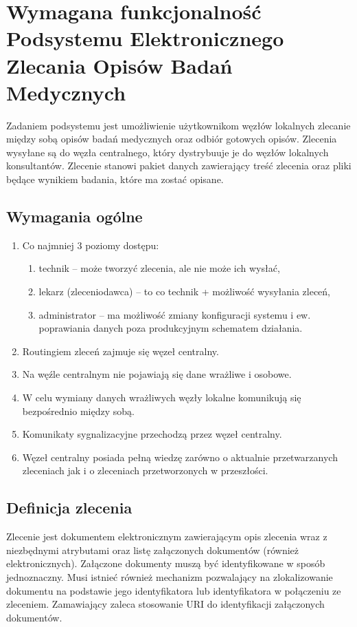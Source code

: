 \documentclass[a4paper]{article}
\begin{document}
\section{Wymagana funkcjonalność Podsystemu Elektronicznego Zlecania Opisów Badań Medycznych}

Zadaniem podsystemu jest umożliwienie użytkownikom węzłów lokalnych zlecanie między sobą opisów badań medycznych oraz odbiór gotowych opisów. Zlecenia wysyłane są do węzła centralnego, który dystrybuuje je do węzłów lokalnych konsultantów. Zlecenie stanowi pakiet danych zawierający treść zlecenia oraz pliki będące wynikiem badania, które ma zostać opisane. 

\subsection{Wymagania ogólne}
\begin{enumerate}
\item Co najmniej 3 poziomy dostępu:
        \begin{enumerate}
        \item technik -- może tworzyć zlecenia, ale nie może ich wysłać,
        \item lekarz (zleceniodawca) -- to co technik + możliwość wysyłania zleceń,
        \item administrator -- ma możliwość zmiany konfiguracji systemu i ew. poprawiania danych poza produkcyjnym schematem działania.
        \end{enumerate}
\item Routingiem zleceń zajmuje się węzeł centralny.
\item Na węźle centralnym nie pojawiają się dane wrażliwe i osobowe.
\item W celu wymiany danych wrażliwych węzły lokalne komunikują się bezpośrednio między sobą.
\item Komunikaty sygnalizacyjne przechodzą przez węzeł centralny.
\item Węzeł centralny posiada pełną wiedzę zarówno o aktualnie przetwarzanych zleceniach jak i o zleceniach przetworzonych w przeszłości.
\end{enumerate}

\subsection{Definicja zlecenia}

Zlecenie jest dokumentem elektronicznym zawierającym opis zlecenia wraz z niezbędnymi atrybutami oraz listę załączonych dokumentów (również elektronicznych). Załączone dokumenty muszą być identyfikowane w sposób jednoznaczny. Musi istnieć również mechanizm pozwalający na zlokalizowanie dokumentu na podstawie jego identyfikatora lub identyfikatora w połączeniu ze zleceniem. Zamawiający zaleca stosowanie URI do identyfikacji załączonych dokumentów.
\end{document}
